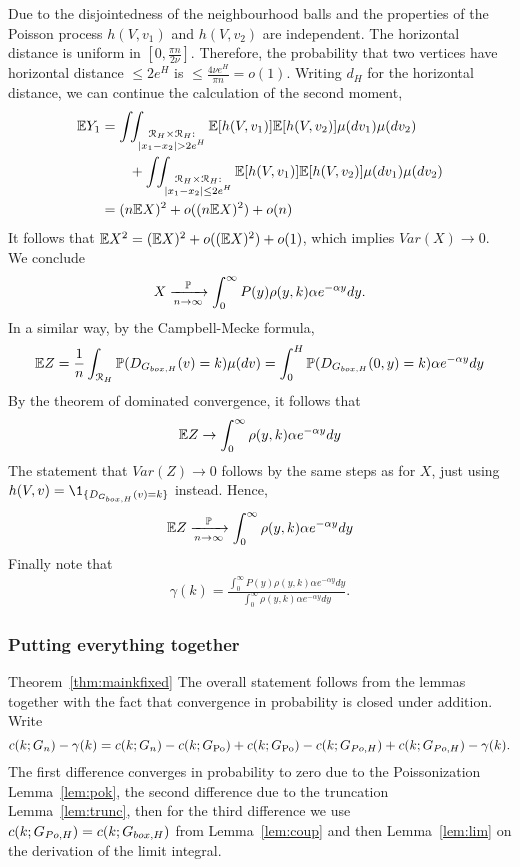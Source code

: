 Due to the disjointedness of the neighbourhood balls and the properties of the Poisson process $h(V,v_1)$ and $h(V,v_2)$ are independent. The horizontal distance is uniform in $[0,\frac{\pi n}{2\nu}]$. Therefore, the probability that two vertices have horizontal distance $\leq 2e^H$ is $\leq \frac{4\nu e^H}{\pi n} = o(1)$. Writing $d_H$ for the horizontal distance, we can continue the calculation of the second moment,
\begin{align*}
\E Y_1 &= \int_{} \int_{\substack{\Rcal_H\times \Rcal_H:\\ |x_1-x_2|>2 e^H}} \E[ h(V,v_1)]\E[h(V,v_2)]\mu(dv_1)\mu(dv_2)\\
&\qquad+\int_{} \int_{\substack{\Rcal_H\times \Rcal_H:\\ |x_1-x_2|\leq2 e^H}} \E[ h(V,v_1)]\E[h(V,v_2)]\mu(dv_1)\mu(dv_2) \\
&= (n\E X)^2+o((n\E X)^2)+o(n)
\end{align*}
It follows that $\mathbb{E} X^2 = (\mathbb{E} X)^2 + o((\mathbb{E} X)^2)+o(1)$, which implies $Var(X) \rightarrow 0$. We conclude
$$X \xrightarrow[n\rightarrow\infty]{\mathbb{P}} \int_0^\infty P(y)\rho(y,k)\alpha e^{-\alpha y}dy.$$
In a similar way, by the Campbell-Mecke formula,
\begin{align*}
\mathbb{E} Z =\frac{1}{n} \int_{{\mathcal R}_H} \mathbb{P}(D_{G_{box,H}}(v)=k) \mu(dv) = \int_0^H \mathbb{P}(D_{G_{box,H}}(0,y)=k) \alpha e^{-\alpha y}dy
\end{align*}
By the theorem of dominated convergence, it follows that
\begin{align*}
\mathbb{E} Z \rightarrow \int_0^\infty \rho(y,k)\alpha e^{-\alpha y}dy
\end{align*}
The statement that $Var(Z) \rightarrow 0$ follows by the same steps as for $X$, just using $h(V,v) = \1_{\{D_{\GboxH}(v)=k\}}$ instead. Hence,
\begin{align*}
\mathbb{E} Z \xrightarrow[n\rightarrow\infty]{\mathbb{P}} \int_0^\infty \rho(y,k)\alpha e^{-\alpha y}dy
\end{align*}
Finally note that 
\begin{align*}
\gamma(k) = \frac{\int_0^\infty P(y)\rho(y,k)\alpha e^{-\alpha y}dy}{\int_0^\infty \rho(y,k)\alpha e^{-\alpha y}dy}.
\end{align*}

\subsubsection{Putting everything together}
\begin{proofof}{Theorem~\ref{thm:mainkfixed}}
The overall statement follows from the lemmas together with the fact that convergence in probability is closed under addition.
Write 
$$c(k;G_n)-\gamma(k) = c(k;G_n) - c(k;G_{\text{Po}})+c(k;G_{\text{Po}})-c(k;G_{Po,H})+c(k;G_{Po,H})-\gamma(k).$$ 
The first difference converges in probability to zero due to the Poissonization Lemma~\ref{lem:pok}, the second difference due to the truncation Lemma~\ref{lem:trunc}, then for the third difference we use $c(k;G_{Po,H})=c(k;G_{box,H})$ from Lemma~\ref{lem:coup} and then Lemma~\ref{lem:lim} on the derivation of the limit integral.
\end{proofof}

